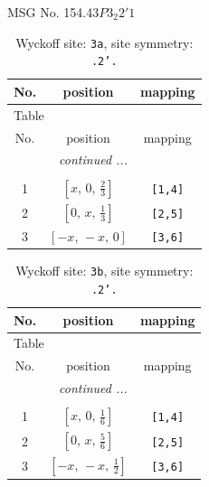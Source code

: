 \documentclass[fleqn,8pt]{jsarticle}
\begin{document}
\setcounter{MaxMatrixCols}{32}

\renewcommand{\tablename}{Table~}
\renewcommand{\figurename}{Figure~}
\begin{center}
\LARGE
MSG No. 154.43\quad$P3_{2}2'1$
\end{center}
\renewcommand{\arraystretch}{1.2}
\begin{longtable}{ccc}
\caption{Wyckoff site: {\tt 3a}, site symmetry: {\tt .2'.}}
 \\
 \hline \hline
No. & position & mapping \\ \hline \endfirsthead

\multicolumn{2}{l}{\tablename\ \thetable{}} \\
 \hline \hline
No. & position & mapping \\ \hline \endhead

 \hline \hline
\multicolumn{2}{r}{\footnotesize\it continued ...} \\ \endfoot

 \hline \hline
\multicolumn{2}{r}{} \\ \endlastfoot

1 & $\left[ x,\, 0,\, \frac{2}{3} \right]$ & {\tt [1,4]} \\ \hline
2 & $\left[ 0,\, x,\, \frac{1}{3} \right]$ & {\tt [2,5]} \\ \hline
3 & $\left[ - x,\, - x,\, 0 \right]$ & {\tt [3,6]} \\
\end{longtable}
\renewcommand{\arraystretch}{1.2}
\begin{longtable}{ccc}
\caption{Wyckoff site: {\tt 3b}, site symmetry: {\tt .2'.}}
 \\
 \hline \hline
No. & position & mapping \\ \hline \endfirsthead

\multicolumn{2}{l}{\tablename\ \thetable{}} \\
 \hline \hline
No. & position & mapping \\ \hline \endhead

 \hline \hline
\multicolumn{2}{r}{\footnotesize\it continued ...} \\ \endfoot

 \hline \hline
\multicolumn{2}{r}{} \\ \endlastfoot

1 & $\left[ x,\, 0,\, \frac{1}{6} \right]$ & {\tt [1,4]} \\ \hline
2 & $\left[ 0,\, x,\, \frac{5}{6} \right]$ & {\tt [2,5]} \\ \hline
3 & $\left[ - x,\, - x,\, \frac{1}{2} \right]$ & {\tt [3,6]} \\
\end{longtable}
\end{document}
